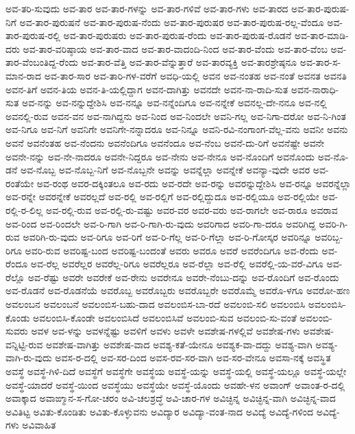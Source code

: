 {ಅವ-ತರಿ-ಸುವುದು
ಅವ-ತಾರ
ಅವ-ತಾರ-ಗಳನ್ನು
ಅವ-ತಾರ-ಗಳಿವೆ
ಅವ-ತಾರ-ಗಳು
ಅವ-ತಾರದ
ಅವ-ತಾರ-ಪುರುಷ-ನಿಗೆ
ಅವ-ತಾರ-ಪುರುಷನೆ
ಅವ-ತಾರ-ಪುರುಷ-ನೆಂದು
ಅವ-ತಾರ-ಪುರುಷರ
ಅವ-ತಾರ-ಪುರುಷ-ರಲ್ಲ-ವೆಂದೂ
ಅವ-ತಾರ-ಪುರುಷ-ರಲ್ಲಿ
ಅವ-ತಾರ-ಪುರುಷರು
ಅವ-ತಾರ-ಪುರುಷ-ರೆಂದು
ಅವ-ತಾರ-ಪುರುಷ-ರೊಡನೆ
ಅವ-ತಾರ-ಮಾಡಿ-ದರು
ಅವ-ತಾರ-ವರಿಷ್ಠಾಯ
ಅವ-ತಾರ-ವಾದ
ಅವ-ತಾರ-ವಾದಂದಿ-ನಿಂದ
ಅವ-ತಾರ-ವೆಂದು
ಅವ-ತಾರ-ವೆಂಬ
ಅವ-ತಾರ-ವೆಂಬಂತಿದ್ದ-ರೆಂದು
ಅವ-ತಾರ-ವೆತ್ತಿ
ಅವ-ತಾರ-ವೆನ್ನುತ್ತಾರೆ
ಅವ-ತಾರವ್ಯಕ್ತಿ
ಅವ-ತಾರಶ್ರೇಷ್ಠನೂ
ಅವ-ತಾರ-ಸ-ಮಾನ-ರಾದ
ಅವ-ತಾರ-ಸಾರ
ಅವ-ತಾರಿ-ಗಳ-ವರೆಗೆ
ಅವಧಿ-ಯಲ್ಲಿ
ಅವನ
ಅವ-ನಂತಹ
ಅವ-ನಂತೆ
ಅವನತ
ಅವನತಿ
ಅವನ-ತಿಗೆ
ಅವನ-ತಿಯ
ಅವನ-ತಿ-ಯಲ್ಲಿದ್ದಾಗ
ಅವನ-ದಾಗಿತ್ತು
ಅವನದೇ
ಅವನ-ನಾ-ರಾದಿ-ಸುತ
ಅವನ-ನಾರಾಧಿ-ಸುತ
ಅವ-ನನ್ನು
ಅವ-ನನ್ನುದ್ದೇಶಿಸಿ
ಅವ-ನನ್ನೂ
ಅವ-ನನ್ನೆಂದಿಗೂ
ಅವ-ನನ್ನೇಕೆ
ಅವನಲ್ಲ-ದೇ-ನನೂ
ಅವ-ನಲ್ಲಿ
ಅವನಲ್ಲಿ-ರುವ
ಅವನ-ವನ
ಅವ-ನಾಗಿದ್ದನು
ಅವ-ನಿಂದ
ಅವ-ನಿಂದಲೇ
ಅವನಿ-ಗಲ್ಲ
ಅವ-ನಿಗಾ-ದರೋ
ಅವ-ನಿ-ಗಿಂತ
ಅವ-ನಿಗೂ
ಅವ-ನಿಗೆ
ಅವನಿಗೇ
ಅವನಿಗೇ-ನನ್ನಾದರೂ
ಅವ-ನಿನ್ನೂ
ಅವನಿ-ರವಿ-ನಂಗಾಂಗ-ವೆಲ್ಲ-ವನು
ಅವನೀ
ಅವನು
ಅವನೆ
ಅವನೆಂತಹ
ಅವ-ನೆಂದನು
ಅವನೆಂದಿಗೂ
ಅವನೆಂದೂ
ಅವ-ನೆಂಬ
ಅವನೆ-ದು-ರಿಗೆ
ಅವನೆಷ್ಟೇ
ಅವನೇ
ಅವನೇ-ನನ್ನು
ಅವ-ನೇ-ನಾದರೂ
ಅವನೇ-ನಿದ್ದರೂ
ಅವ-ನೇನು
ಅವ-ನೇನೂ
ಅವ-ನೊಂದಿಗೆ
ಅವನೊಂದು
ಅವ-ನೊ-ಡನೆ
ಅವ-ನೊಬ್ಬ
ಅವ-ನೊಬ್ಬ-ನಿಗೆ
ಅವ-ನೊಬ್ಬನೇ
ಅವನ್ನು
ಅವನ್ನೆಲ್ಲಾ
ಅವನ್ನೇಕೆ
ಅವನ್ಯಾ-ವುದೇ
ಅವರ
ಅವ-ರಂತೆಯೇ
ಅವ-ರಂಥ
ಅವರ-ದಕ್ಕಿಂತಲೂ
ಅವ-ರದು
ಅವ-ರದೇ
ಅವ-ರನ್ನು
ಅವರನ್ನುದ್ದೇಶಿಸಿ
ಅವ-ರನ್ನೂ
ಅವರನ್ನೆಲ್ಲಾ
ಅವ-ರನ್ನೇ
ಅವರನ್ನೇಕೆ
ಅವರಲ್ಲದೆ
ಅವ-ರಲ್ಲಿ
ಅವ-ರಲ್ಲಿಗೆ
ಅವ-ರಲ್ಲಿದ್ದುದೂ
ಅವ-ರಲ್ಲಿಯೂ
ಅವ-ರಲ್ಲಿಯೇ
ಅವ-ರಲ್ಲಿ-ರ-ಲಿಲ್ಲ
ಅವ-ರಲ್ಲಿ-ರುವ
ಅವ-ರಲ್ಲಿ-ರು-ವಷ್ಟು
ಅವರ-ವರ
ಅವರ-ವರು
ಅವ-ರಾಗಲೇ
ಅವ-ರಾರೂ
ಅವರಾವ
ಅವ-ರಿಂದ
ಅವ-ರಿಂದಲೇ
ಅವ-ರಿ-ಗಾಗಿ
ಅವ-ರಿ-ಗಾಗಿ-ರು-ವುದು
ಅವರಿಗಾದ
ಅವರಿ-ಗಾ-ದರೂ
ಅವರಿಗಿದ್ದ
ಅವರಿ-ಗಿ-ರುವ
ಅವರಿಗಿ-ರು-ವುದು
ಅವ-ರಿಗೂ
ಅವ-ರಿಗೆ
ಅವ-ರಿ-ಗೆಲ್ಲ
ಅವ-ರಿ-ಗೆಲ್ಲಾ
ಅವ-ರಿ-ಗೋಸ್ಕರ
ಅವರಿನ್ನೂ
ಅವರಿಬ್ಬ-ರಿಗೂ
ಅವರಿ-ರುವ
ಅವರಿಷ್ಟ-ಬಂದ
ಅವರಿಷ್ಟ-ಬಂದಂತೆ
ಅವರು
ಅವರೂ
ಅವರೆ
ಅವರೆಂದಿಗೂ
ಅವ-ರೆಂದು
ಅವ-ರೆಂದೂ
ಅವ-ರೆಲ್ಲ
ಅವರೆಲ್ಲರ
ಅವರೆಲ್ಲ-ರಿಗೂ
ಅವರೆಲ್ಲರೂ
ಅವ-ರೆಲ್ಲಾ
ಅವ-ರೆಲ್ಲಿ
ಅವರೆಲ್ಲಿ-ಯ-ವರೆ-ವಿಗೂ
ಅವ-ರೆಲ್ಲೊ
ಅವ-ರೆಷ್ಟು
ಅವರೇ
ಅವರೇಕೆ
ಅವ-ರೇನು
ಅವರೇನೂ
ಅವರೇ-ನೆಂಬು-ದನ್ನು
ಅವ-ರೊಂದಿಗೆ
ಅವ-ರೊಂದು
ಅವ-ರೊಡನೆ
ಅವ-ರೊಡನೆಯೆ
ಅವರೊಬ್ಬ
ಅವರೊಬ್ಬರು
ಅವರೊಬ್ಬರೇ
ಅವರೊಮ್ಮೆ
ಅವರೊ-ಳಗೂ
ಅವರೋ-ಹಣ
ಅವಲಂಬನ
ಅವಲಂಬನೆ
ಅವಲಂಬಿಸ-ಬಹು-ದಾದ
ಅವಲಂಬಿಸ-ಬಾ-ರದೆ
ಅವಲಂಬಿ-ಸಲಿ
ಅವಲಂಬಿಸಿ
ಅವಲಂಬಿಸಿ-ಕೊಂಡು
ಅವಲಂಬಿಸಿ-ಕೊಂಡೇ
ಅವಲಂಬಿಸಿದೆ
ಅವಲಂಬಿಸಿವೆ
ಅವಲಂಬಿ-ಸುವ
ಅವಲಂಬಿ-ಸು-ವಂತೆ
ಅವಲಂಬಿ-ಸುವರು
ಅವಳ
ಅವ-ಳನ್ನು
ಅವಳನ್ನೆಷ್ಟು
ಅವಳಿಗೆ
ಅವಳು
ಅವಳೇ
ಅವಶೇಷ-ಗಳಲ್ಲಿವೆ
ಅವಶೇಷ-ಗಳು
ಅವಶೇಷ-ವನ್ನಿಟ್ಟಿ-ರುವ
ಅವಶೇಷ-ವಾಗಿತ್ತು
ಅವಶೇಷ-ವಾದ
ಅವಶ್ಯ-ಕತೆ-ಯೇನೂ
ಅವಶ್ಯಕ-ವಾ-ದದ್ದು
ಅವಶ್ಯ-ವಾಗಿ
ಅವಶ್ಯ-ವಾಗಿ-ರು-ವುದು
ಅವಸ-ರ-ದಲ್ಲಿ
ಅವ-ಸರ-ದಿಂದ
ಅವಸ-ರವ-ಸರ-ವಾಗಿ
ಅವ-ಸರ-ವೇನೂ
ಅವಸಾ-ನಕ್ಕೆ
ಅವಸ್ಥಿತ
ಅವಸ್ಥೆ
ಅವಸ್ಥೆ-ಗಿಳಿ-ದಿದೆ
ಅವಸ್ಥೆಗೆ
ಅವಸ್ಥೆಗೇ
ಅವಸ್ಥೆಯ
ಅವಸ್ಥೆ-ಯನ್ನು
ಅವಸ್ಥೆ-ಯಲ್ಲಿ
ಅವಸ್ಥೆ-ಯಲ್ಲೂ
ಅವಸ್ಥೆ-ಯಲ್ಲೇ
ಅವಸ್ಥೆ-ಯಾದರೆ
ಅವಸ್ಥೆ-ಯಿಂದ
ಅವಸ್ಥೆಯು
ಅವಸ್ಥೆಯೇ
ಅವಸ್ಥೆ-ಯೊಂದು
ಅವಹೇ-ಳನ
ಅವಾಂಗ್
ಅವಾಂತ-ರ-ದಲ್ಲಿ
ಅವಾಕ್ಕಾದ
ಅವಾಙ್ಮಾನ-ಸ-ಗೋ-ಚರಂ
ಅವಿ-ಚಲಶ್ರದ್ಧೆ
ಅವಿ-ಚಾರ-ಗಳ
ಅವಿಚ್ಛಿನ್ನ
ಅವಿಚ್ಛಿನ್ನ-ವಾಗಿ
ಅವಿಚ್ಛಿನ್ನ-ವಾದ
ಅವಿತಿಟ್ಟ
ಅವಿತು-ಕೊಂಡಿತು
ಅವಿತು-ಕೊಳ್ಳುವನು
ಅವಿದ್ಯಾರ
ಅವಿದ್ಯಾ-ವಂತ-ನಾದ
ಅವಿದ್ಯೆ
ಅವಿದ್ಯೆ-ಗಳಿಂದ
ಅವಿದ್ಯೆ-ಗಳು
ಅವಿವಾಹಿತ
}
